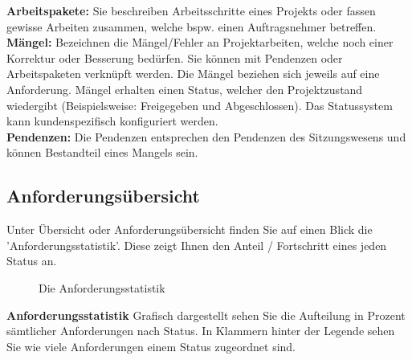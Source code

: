 \textbf{Arbeitspakete:} Sie beschreiben Arbeitsschritte eines Projekts oder fassen gewisse Arbeiten zusammen, welche bspw. einen Auftragsnehmer betreffen. \\

\textbf{Mängel:} Bezeichnen die Mängel/Fehler an Projektarbeiten, welche noch einer Korrektur oder Besserung bedürfen. Sie können mit Pendenzen oder Arbeitspaketen verknüpft werden. Die Mängel beziehen sich jeweils auf eine Anforderung. Mängel erhalten einen Status, welcher den Projektzustand wiedergibt (Beispielsweise: Freigegeben und Abgeschlossen). Das Statussystem kann kundenspezifisch konfiguriert werden. \\

\textbf{Pendenzen:} Die Pendenzen entsprechen den Pendenzen des Sitzungswesens und können Bestandteil eines Mangels sein. 

\pagebreak

\subsection{Anforderungsübersicht}

Unter Übersicht oder Anforderungsübersicht finden Sie auf einen Blick die 'Anforderungsstatistik'. Diese zeigt Ihnen den Anteil / Fortschritt eines jeden Status an.

\begin{figure}[H]
\caption{Die Anforderungsstatistik}
\end{figure}

\textbf{Anforderungsstatistik}
Grafisch dargestellt sehen Sie die Aufteilung in Prozent sämtlicher Anforderungen nach Status. In Klammern hinter der Legende sehen Sie wie viele Anforderungen einem Status zugeordnet sind. \\

